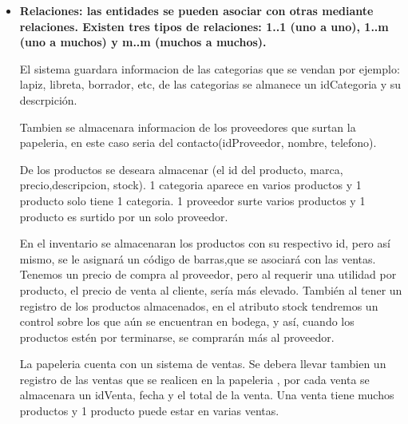 \documentclass[30pt,fleqn]{article}
\begin{document}
\begin{itemize}
\begin{itemize}
\end{itemize}


\vspace{10mm} %
\vspace{10mm} %
\item \textbf{Relaciones: las entidades se pueden asociar con otras mediante relaciones. Existen tres tipos de relaciones: 1..1 (uno a uno), 1..m (uno a muchos) y m..m (muchos a muchos). }

\vspace{10mm} %

El sistema guardara informacion de las categorias que se vendan por ejemplo: lapiz, libreta, borrador, etc, de las categorias se almanece un idCategoria y su descrpición. 

\vspace{10mm} %
Tambien se almacenara informacion de los proveedores que surtan la papeleria, en este caso seria del contacto(idProveedor, nombre, telefono).

\vspace{10mm} %
De los productos se deseara almacenar (el id del producto, marca, precio,descripcion, stock).
1 categoria aparece en varios productos y 1 producto solo tiene 1 categoria. 1 proveedor surte varios productos y 1 producto es surtido por un solo proveedor.

\vspace{10mm} %
En el inventario se almacenaran los productos con su respectivo id, pero así mismo, se le asignará un código de barras,que se asociará con las ventas. Tenemos un precio de compra al proveedor, pero al requerir una utilidad por producto, el precio de venta al cliente, sería más elevado. También al tener un registro de los productos almacenados, en el atributo stock tendremos un control sobre los que aún se encuentran en bodega, y así, cuando los productos estén por terminarse, se comprarán más al proveedor.

\vspace{10mm} %

La papeleria cuenta con un sistema de ventas.
Se debera llevar tambien un registro de las ventas que se realicen en la papeleria , por cada venta se almacenara un idVenta, fecha y el total de la venta. Una venta tiene muchos productos y 1 producto puede estar en varias ventas.

\vspace{10mm} %


\end{itemize}
\end{document}
